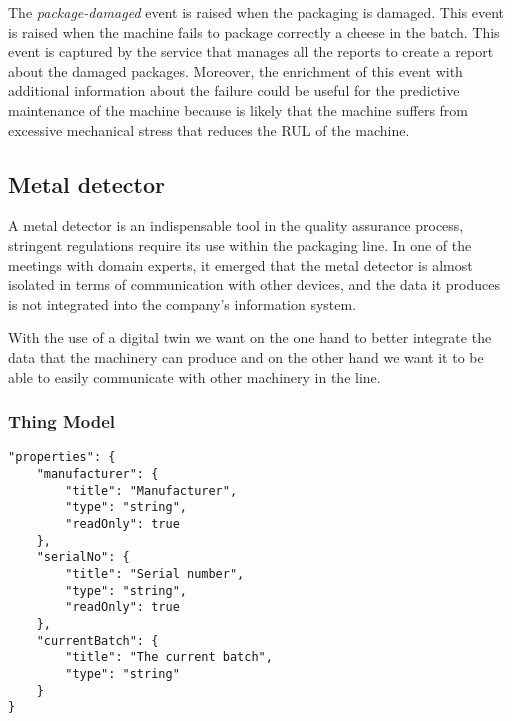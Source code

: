 The \textit{package-damaged} event is raised when the packaging is damaged. This event is raised when the machine fails to package correctly a cheese in the batch. This event is captured by the service that manages all the reports to create a report about the damaged packages.
Moreover, the enrichment of this event with additional information about the failure could be useful for the predictive maintenance of the machine
because is likely that the machine suffers from excessive mechanical stress that reduces the RUL of the machine.



\subsection{Metal detector}
A metal detector is an indispensable tool in the quality assurance process, stringent regulations require its use within the packaging line.
In one of the meetings with domain experts, it emerged that the metal detector is almost isolated in terms of communication with other devices, and
the data it produces is not integrated into the company's information system.

With the use of a digital twin we want on the one hand to better integrate the data that the machinery can produce and on the other hand we
want it to be able to easily communicate with other machinery in the line.

\subsubsection{Thing Model}

\begin{lstlisting}[caption={Properties of the metal detector Thing Model.},label={lst:prop-metal}]
"properties": {
	"manufacturer": {
		"title": "Manufacturer",
		"type": "string",
		"readOnly": true
	},
	"serialNo": {
		"title": "Serial number",
		"type": "string",
		"readOnly": true
	},
	"currentBatch": {
		"title": "The current batch",
		"type": "string"
	}
}
\end{lstlisting}

